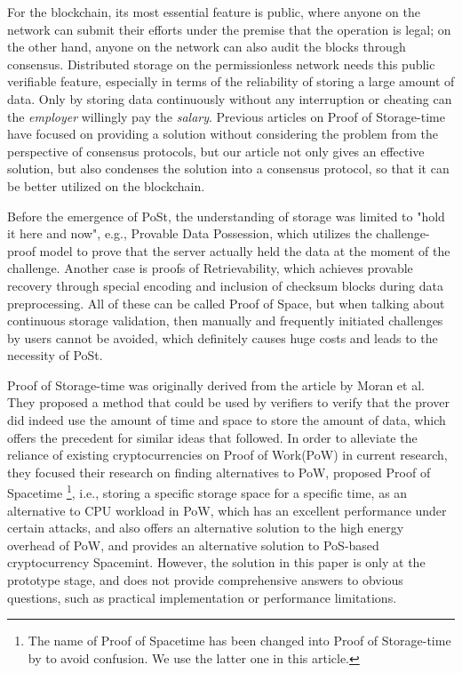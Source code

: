 \documentclass[journal]{IEEEtran}
\begin{document}
For the blockchain, its most essential feature is public, where anyone on the network can submit their efforts under the premise that the operation is legal; on the other hand, anyone on the network can also audit the blocks through consensus. Distributed storage on the permissionless network needs this public verifiable feature, especially in terms of the reliability of storing a large amount of data. Only by storing data continuously without any interruption or cheating can the \textit{employer} willingly pay the \textit{salary}. Previous articles on Proof of Storage-time have focused on providing a solution without considering the problem from the perspective of consensus protocols, but our article not only gives an effective solution, but also condenses the solution into a consensus protocol, so that it can be better utilized on the blockchain.


Before the emergence of PoSt, the understanding of storage was limited to "hold it here and now", e.g., Provable Data Possession\cite{2007pdp}, which utilizes the challenge-proof model to prove that the server actually held the data at the moment of the challenge. Another case is proofs of Retrievability\cite{2007pors}, which achieves provable recovery through special encoding and inclusion of checksum blocks during data preprocessing. All of these can be called Proof of Space, but when talking about continuous storage validation, then manually and frequently initiated challenges by users cannot be avoided, which definitely causes huge costs and leads to the necessity of PoSt.


Proof of Storage-time was originally derived from the article \cite{2019pospacetime} by Moran et al. They proposed a method that could be used by verifiers to verify that the prover did indeed use the amount of time and space to store the amount of data, which offers the precedent for similar ideas that followed. In order to alleviate the reliance of existing cryptocurrencies on Proof of Work(PoW)\cite{2008bitcoin} in current research, they focused their research on finding alternatives to PoW, proposed Proof of Spacetime \footnote{The name of Proof of Spacetime has been changed into Proof of Storage-time by \cite{2020cpost} to avoid confusion. We use the latter one in this article.}, i.e., storing a specific storage space for a specific time, as an alternative to CPU workload in PoW, which has an excellent performance under certain attacks, and also offers an alternative solution to the high energy overhead of PoW, and provides an alternative solution to PoS\cite{2013pos}-based cryptocurrency Spacemint\cite{2018spacemint}. However, the solution in this paper is only at the prototype stage, and does not provide comprehensive answers to obvious questions, such as practical implementation or performance limitations.
\end{document}
